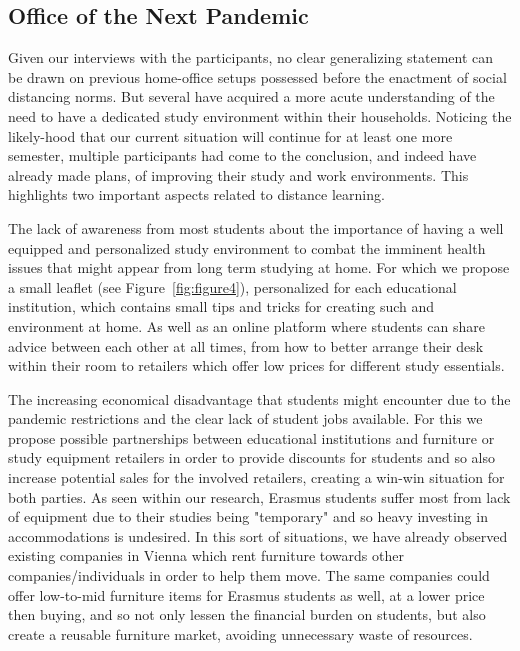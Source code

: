 \documentclass{sigchi}
\begin{document}
\subsection{Office of the Next Pandemic}

Given our interviews with the participants, no clear generalizing statement can be drawn on previous home-office setups possessed before the enactment of social distancing norms. But several have acquired a more acute understanding of the need to have a dedicated study environment within their households. Noticing the likely-hood that our current situation will continue for at least one more semester, multiple participants had come to the conclusion, and indeed have already made plans, of improving their study and work environments. This highlights two important aspects related to distance learning. 

The lack of awareness from most students about the importance of having a well equipped and personalized study environment to combat the imminent health issues that might appear from long term studying at home. For which we propose a small leaflet (see Figure~\ref{fig:figure4}), personalized for each educational institution, which contains small tips and tricks for creating such and environment at home. As well as an online platform where students can share advice between each other at all times, from how to better arrange their desk within their room to retailers which offer low prices for different study essentials.

The increasing economical disadvantage that students might encounter due to the pandemic restrictions and the clear lack of student jobs available. For this we propose possible partnerships between educational institutions and furniture or study equipment retailers in order to provide discounts for students and so also increase potential sales for the involved retailers, creating a win-win situation for both parties. As seen within our research, Erasmus students suffer most from lack of equipment due to their studies being "temporary" and so heavy investing in accommodations is undesired. In this sort of situations, we have already observed existing companies in Vienna\cite{orr_2020} which rent furniture towards other companies/individuals in order to help them move. The same companies could offer low-to-mid furniture items for Erasmus students as well, at a lower price then buying, and so not only lessen the financial burden on students, but also create a reusable furniture market, avoiding unnecessary waste of resources.
\end{document}

